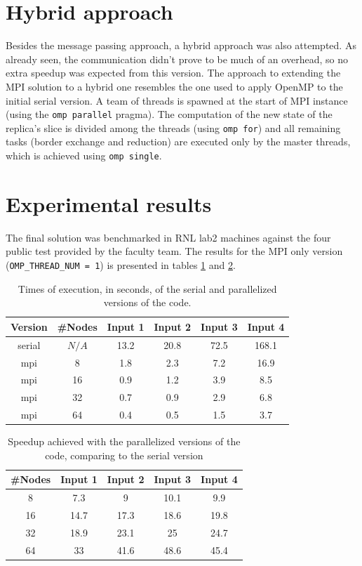 \documentclass{article}
\begin{document}
\section{Hybrid approach}

Besides the message passing approach, a hybrid approach was also attempted.
As already seen, the communication didn't prove to be much of an overhead, so
no extra speedup was expected from this version. The approach to extending the MPI
solution to a hybrid one resembles the one used to apply OpenMP to the initial
serial version. A team of threads is spawned at the start of MPI instance (using
the \texttt{omp parallel} pragma).
The computation of the new state of the replica's slice is divided among the
threads (using \texttt{omp for}) and all remaining tasks (border exchange and reduction)
are executed only by the master threads, which is achieved using \texttt{omp single}.

\section{Experimental results}

The final solution was benchmarked in RNL lab2 machines against the four public
test provided by the faculty team. The results for the MPI only version 
(\texttt{OMP\_THREAD\_NUM = 1}) is presented in tables \ref{execution-times} and
\ref{speedup}.

\begin{table}[h!]
	\centering
	\begin{tabular}{||c c c c c c||} 
	 \hline
	 Version & \#Nodes & Input 1 & Input 2 & Input 3 & Input 4\\ [0.5ex] 
	 \hline\hline
	 serial & $N/A$ & 13.2 & 20.8 & 72.5 & 168.1 \\ 
	 mpi & 8 & 1.8 & 2.3 & 7.2 & 16.9 \\ 
	 mpi & 16 & 0.9 & 1.2 & 3.9 & 8.5  \\
	 mpi & 32 & 0.7 & 0.9 & 2.9 & 6.8 \\
	 mpi & 64 & 0.4 & 0.5 & 1.5 & 3.7 \\ [1ex] 
	 \hline
	\end{tabular}
	\caption{Times of execution, in seconds, of the serial and parallelized versions of the code.}
	\label{execution-times}
\end{table}

\begin{table}[h!]
	\centering
	\begin{tabular}{||c c c c c||} 
	 \hline
	 \#Nodes & Input 1 & Input 2 & Input 3 & Input 4\\ [0.5ex] 
	 \hline\hline
	 8 & 7.3 & 9 & 10.1 & 9.9 \\ 
	 16 & 14.7 & 17.3 & 18.6 & 19.8  \\
	 32 & 18.9 & 23.1 & 25 & 24.7 \\
	 64 & 33 & 41.6 & 48.6 & 45.4 \\ [1ex] 
	 \hline
	\end{tabular}
	\caption{Speedup achieved with the parallelized versions of the code, comparing to the serial version}
	\label{speedup}
\end{table}
\end{document}
